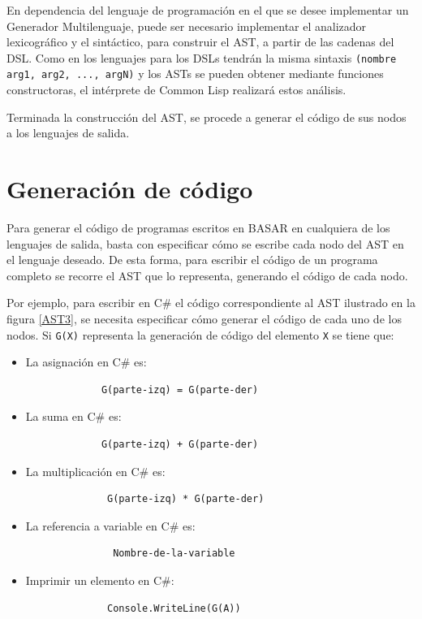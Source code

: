   En dependencia del lenguaje de programación en el que se desee implementar un Generador Multilenguaje, puede ser necesario implementar el analizador lexicográfico y el sintáctico, para construir el AST, a partir de las cadenas del DSL. Como en {\gagm} los lenguajes para los DSLs tendrán la misma sintaxis \texttt{(nombre arg1, arg2, ..., argN)} y los ASTs se pueden obtener mediante funciones constructoras, el intérprete de Common Lisp realizará estos análisis.
  
  Terminada la construcción del AST, se procede a generar el código de sus nodos a los lenguajes de salida.
  
  \section{Generación de código }
  
Para generar el código de programas escritos en BASAR en cualquiera de los lenguajes de salida, basta con especificar cómo se escribe cada nodo del AST en el lenguaje deseado. De esta forma, para escribir el código de un programa completo se recorre el AST que lo representa, generando el código de cada nodo.

Por ejemplo, para escribir en C\# el código correspondiente al AST ilustrado en la figura \ref{AST3}, se necesita especificar cómo generar el código de cada uno de los nodos. Si \texttt{G(X)} representa la generación de código del elemento \texttt{X} se tiene que:

\begin{itemize}
    \item La asignación en C\# es: 
          \begin{verbatim}
             G(parte-izq) = G(parte-der)  
          \end{verbatim}
    \item La suma en C\# es:
     \begin{verbatim}
             G(parte-izq) + G(parte-der)  
     \end{verbatim}
    \item La multiplicación en C\# es:
       \begin{verbatim}
              G(parte-izq) * G(parte-der)  
       \end{verbatim}
    
    \item   La referencia a variable en C\# es:
       \begin{verbatim}
               Nombre-de-la-variable
       \end{verbatim}

    \item Imprimir un elemento en C\#:
     \begin{verbatim}
              Console.WriteLine(G(A))
     \end{verbatim}
    
\end{itemize}  

